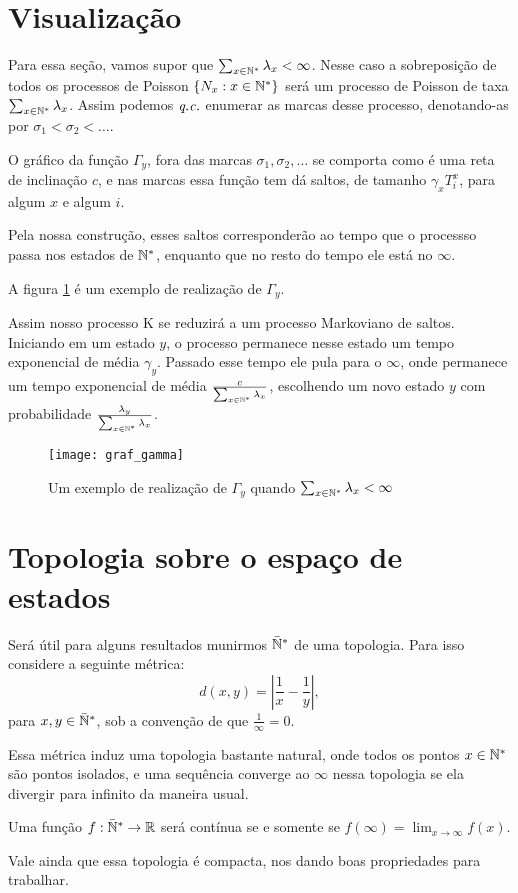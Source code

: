 \section{Visualização}

Para essa seção, vamos supor que $\sum_{x \in {\mathbb{N^*}}} \lambda_x <
\infty$. Nesse caso a sobreposição de todos os processos de Poisson
$\{N_x : x \in {\mathbb{N^*}}\}$ será um processo de Poisson de taxa $\sum_{x \in
  {\mathbb{N^*}}} \lambda_x$. Assim podemos ${\emph{q.c.}}$ enumerar as marcas desse
processo, denotando-as por $ \sigma_1 < \sigma_2 < \ldots$.

O gráfico da função $\Gamma_y$, fora das marcas $\sigma_1, \sigma_2,
\ldots$ se comporta como é uma reta de inclinação $c$, e nas marcas
essa função tem dá saltos, de tamanho $\gamma_x T^x_i$, para algum $x$
e algum $i$.

Pela nossa construção, esses saltos corresponderão ao tempo que o
processso passa nos estados de ${\mathbb{N^*}}$, enquanto que no resto do tempo
ele está no $\infty$.

A figura \ref{fig:graf_gamma} é um exemplo de realização de
$\Gamma_y$.

Assim nosso processo K se reduzirá a um processo Markoviano de
saltos. Iniciando em um estado $y$, o processo permanece nesse estado
um tempo exponencial de média $\gamma_y$. Passado esse tempo ele pula
para o $\infty$, onde permanece um tempo exponencial de média
$\frac{c}{\sum_{x \in {\mathbb{N^*}}} \lambda_x}$, escolhendo um novo estado $y$
com probabilidade $\frac{\lambda_y}{\sum_{x \in {\mathbb{N^*}}} \lambda_x}$.


\begin{figure}
  \centering
  \texttt{[image: graf\_gamma]}
  \caption{Um exemplo de realização de $\Gamma_y$ quando $\sum_{x \in
      {\mathbb{N^*}}} \lambda_x < \infty$}
  \label{fig:graf_gamma}
\end{figure}

\section{Topologia sobre o espaço de estados}

Será útil para alguns resultados munirmos ${\mathbb{\bar{N}^*}}$ de uma
topologia. Para isso considere a seguinte métrica:
\begin{equation}
  \label{eq:metrica}
  d(x, y) = \left\lvert \frac{1}{x} - \frac{1}{y} \right\rvert,
\end{equation}
para $x, y \in {\mathbb{\bar{N}^*}}$, sob a convenção de que $\frac{1}{\infty} = 0$.

Essa métrica induz uma topologia bastante natural, onde todos os
pontos $x \in {\mathbb{N^*}}$ são pontos isolados, e uma sequência converge ao
$\infty$ nessa topologia se ela divergir para infinito da maneira
usual.

Uma função $f: {\mathbb{\bar{N}^*}} \to {\mathbb{R}}$ será contínua se e somente se
$f(\infty) = \lim_{x \to \infty} f(x)$.

Vale ainda que essa topologia é compacta, nos dando boas propriedades
para trabalhar.

